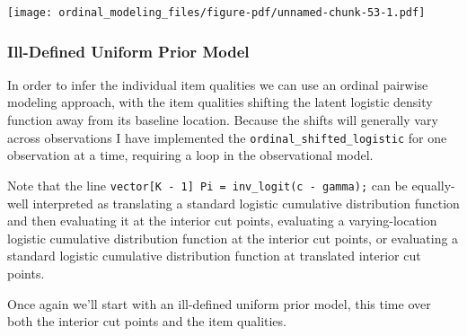 \documentclass[
  letterpaper,
  DIV=11,
  numbers=noendperiod]{scrartcl}
\newenvironment{Shaded}{\begin{snugshade}}{\end{snugshade}}
\newcommand{\AttributeTok}[1]{\textcolor[rgb]{0.40,0.45,0.13}{#1}}
\newcommand{\ControlFlowTok}[1]{\textcolor[rgb]{0.00,0.23,0.31}{#1}}
\newcommand{\DecValTok}[1]{\textcolor[rgb]{0.68,0.00,0.00}{#1}}
\newcommand{\FloatTok}[1]{\textcolor[rgb]{0.68,0.00,0.00}{#1}}
\newcommand{\FunctionTok}[1]{\textcolor[rgb]{0.28,0.35,0.67}{#1}}
\newcommand{\NormalTok}[1]{\textcolor[rgb]{0.00,0.23,0.31}{#1}}
\newcommand{\SpecialCharTok}[1]{\textcolor[rgb]{0.37,0.37,0.37}{#1}}
\newcommand{\StringTok}[1]{\textcolor[rgb]{0.13,0.47,0.30}{#1}}
\begin{document}
\begin{Shaded}
\end{Shaded}

\texttt{[image: ordinal\_modeling\_files/figure-pdf/unnamed-chunk-53-1.pdf]}

\subsubsection{Ill-Defined Uniform Prior
Model}\label{ill-defined-uniform-prior-model}

In order to infer the individual item qualities we can use an ordinal
pairwise modeling approach, with the item qualities shifting the latent
logistic density function away from its baseline location. Because the
shifts will generally vary across observations I have implemented the
\texttt{ordinal\_shifted\_logistic} for one observation at a time,
requiring a loop in the observational model.

Note that the line
\texttt{vector{[}K\ -\ 1{]}\ Pi\ =\ inv\_logit(c\ -\ gamma);} can be
equally-well interpreted as translating a standard logistic cumulative
distribution function and then evaluating it at the interior cut points,
evaluating a varying-location logistic cumulative distribution function
at the interior cut points, or evaluating a standard logistic cumulative
distribution function at translated interior cut points.

Once again we'll start with an ill-defined uniform prior model, this
time over both the interior cut points and the item qualities.
\end{document}

